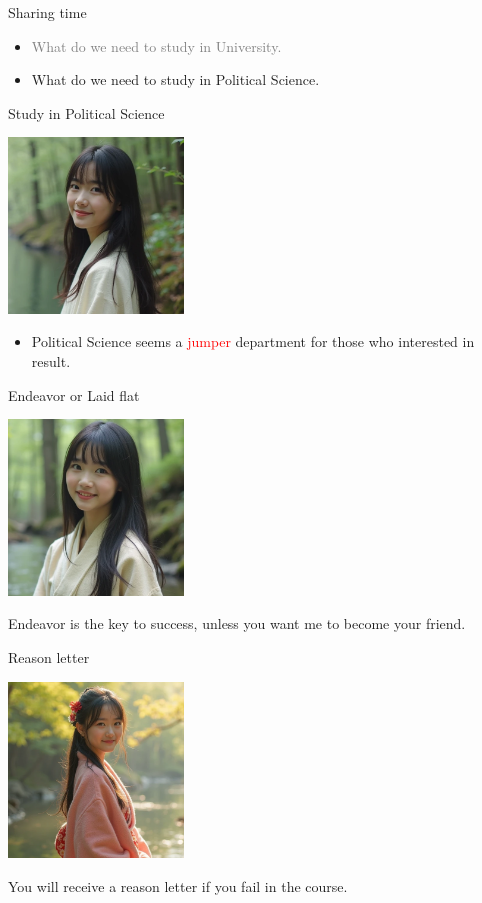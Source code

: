 \documentclass{beamer}
\begin{document}
\begin{frame}{Sharing time}
\begin{itemize}
\item \textcolor{gray}{What do we need to study in University.}
\item What do we need to study in Political Science.
\end{itemize}
\end{frame}
\begin{frame}{Study in Political Science}
\begin{center}
\includegraphics[width=0.35\textwidth]{motivate.png}
\end{center}
\begin{itemize}
\item Political Science seems a \textcolor{red}{jumper} department for those who interested in result.
\end{itemize}
\end{frame}
\begin{frame}{Endeavor or Laid flat}
\begin{center}
\includegraphics[width=0.35\textwidth]{fail.png}
\end{center}
\begin{center}
Endeavor is the key to success, unless you want me to become your friend.
\end{center}
\end{frame}
\begin{frame}{Reason letter}
\begin{center}
\includegraphics[width=0.35\textwidth]{endeavor.png}
\end{center}
\begin{center}
You will receive a reason letter if you fail in the course.
\end{center}
\end{frame}
\end{document}

